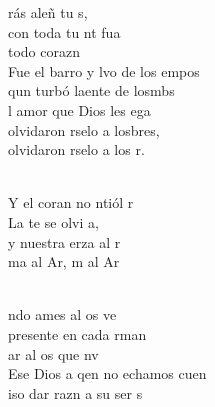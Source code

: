 \begin{cancion}%
	rás aleñ tu s, \\
	con toda tu nt fua\\
	 todo  corazn   \\
	Fue el barro y lvo de los empos\\
	qun turbó laente de losmbs \\
	l amor que Dios les ega \\
	olvidaron rselo a losbres,\\
	olvidaron rselo a los r. \\\jump\\
	\begin{chorus}%
	Y el coran no ntiól r \\
	La te se olvi a,\\
	y nuestra erza al r\\
	ma al Ar, m al Ar  \\
	\end{chorus}%
	\jump\\
	ndo ames al os  ve\\
	presente en cada rman \\
	ar al os que nv   \\
	Ese Dios a qen no echamos cuen\\
	iso dar razn a su ser s\\

\end{cancion}

